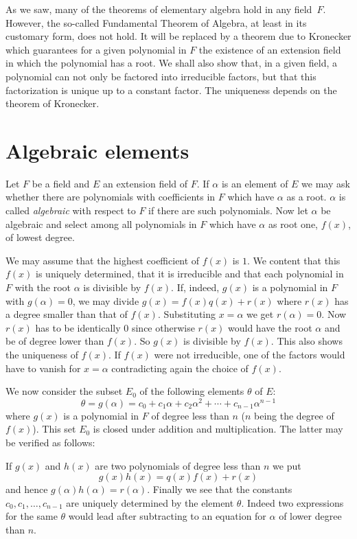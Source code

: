 \documentclass[10pt,leqno,a5paper]{book}
\theoremstyle{definition}
\let\htw\section
\begin{document}
As we saw, many of the theorems of elementary algebra hold in any field~$F$.
However, the so-called Fundamental Theorem of Algebra, at least in its customary form, does not hold.
It will be replaced by a theorem due to Kronecker which guarantees for a given polynomial in $F$ the existence of an extension field in which the polynomial has a root.
We shall also show that, in a given field, a polynomial can not only be factored into irreducible factors, but that this factorization is unique up to a constant factor.
The uniqueness depends on the theorem of Kronecker.


\htw{Algebraic elements}

Let $F$ be a field and $E$ an extension field of $F$.
If $\alpha$ is an element of $E$ we may ask whether there are polynomials with coefficients in $F$ which have $\alpha$ as a root.
$\alpha$ is called \emph{algebraic} with respect to $F$ if there are such polynomials.
Now let $\alpha$ be algebraic and select among all polynomials in $F$ which have $\alpha$ as root one, $f(x)$, of lowest degree.

We may assume that the highest coefficient of $f(x)$ is $1$.
We content that this $f(x)$ is uniquely determined, that it is irreducible and that each polynomial in $F$ with the root $\alpha$ is divisible by $f(x)$.
If, indeed, $g(x)$ is a polynomial in $F$ with $g(\alpha) = 0$, we may divide $g(x) = f(x) q(x) + r(x)$ where $r(x)$ has a degree smaller than that of $f(x)$.
\label{p25}%
Substituting $x = \alpha$ we get $r(\alpha) = 0$.
Now $r(x)$ has to be identically $0$ since otherwise $r(x)$ would have the root $\alpha$ and be of degree lower than $f(x)$.
So $g(x)$ is divisible by $f(x)$.
This also shows the uniqueness of $f(x)$.
If $f(x)$ were not irreducible, one of the factors would have to vanish for $x = \alpha$ contradicting again the choice of $f(x)$.

We now consider the subset $E_0$ of the following elements $\theta$ of $E$:
\[
\theta = g(\alpha) = c_0 + c_1\alpha + c_2\alpha^2 + \cdots + c_{n-1} \alpha^{n-1}
\]
where $g(x)$ is a polynomial in $F$ of degree less than $n$ ($n$ being the degree of $f(x)$).
This set $E_0$ is closed under addition and multiplication.
The latter may be verified as follows:

If $g(x)$ and $h(x)$ are two polynomials of degree less than $n$ we put
\[
g(x) h(x) = q(x) f(x) + r(x)
\]
and hence $g(\alpha) h(\alpha) = r(\alpha)$.
Finally we see that the constants $c_0, c_1, \ldots, c_{n-1}$ are uniquely determined by the element $\theta$.
Indeed two expressions for the same $\theta$ would lead after subtracting to an equation for $\alpha$ of lower degree than $n$.
\end{document}
